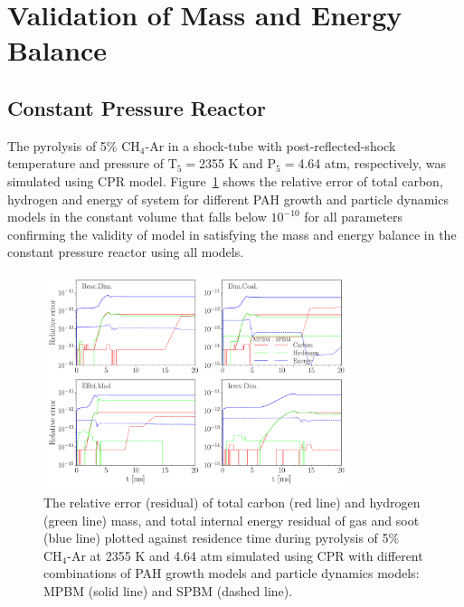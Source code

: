 \section{Validation of Mass and Energy Balance}

\subsection{Constant Pressure Reactor}

The pyrolysis of 5\% $\mathrm{CH_4}$-Ar in a shock-tube with post-reflected-shock temperature and pressure of $\mathrm{T_5}=$2355 K and $\mathrm{P_5}=$4.64 atm, respectively, was simulated using CPR model. Figure~\ref{fig:cprvalid} shows the relative error of total carbon, hydrogen and energy of system for different PAH growth and particle dynamics models in the constant volume that falls below $\mathrm{10^{-10}}$ for all parameters confirming the validity of model in satisfying the mass and energy balance in the constant pressure reactor using all models.

\begin{figure}[H]
	\centering
	\includegraphics[width=0.8\textwidth]{Figures/Results/Validation/CPR/relerr_cpr.pdf}
	\caption{The relative error (residual) of total carbon (red line) and hydrogen (green line) mass, and total internal energy residual of gas and soot (blue line) plotted against residence time during pyrolysis of 5\% $\mathrm{CH_4}$-Ar at 2355 K and 4.64 atm simulated using CPR with different combinations of PAH growth models and particle dynamics models: MPBM (solid line) and SPBM (dashed line).}
	\label{fig:cprvalid}
\end{figure}

